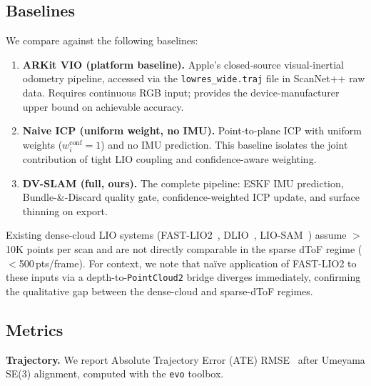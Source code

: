 \subsection{Baselines}
\label{sec:baselines}

We compare against the following baselines:

\begin{enumerate}
    \item \textbf{ARKit VIO (platform baseline).}
    Apple's closed-source visual-inertial odometry pipeline, accessed via the
    \texttt{lowres\_wide.traj} file in ScanNet++ raw data.
    Requires continuous RGB input; provides the device-manufacturer upper
    bound on achievable accuracy.

    \item \textbf{Naive ICP (uniform weight, no IMU).}
    Point-to-plane ICP with uniform weights ($w_i^{\text{conf}} = 1$) and no
    IMU prediction.
    This baseline isolates the joint contribution of tight LIO coupling and
    confidence-aware weighting.

    \item \textbf{DV-SLAM (full, ours).}
    The complete pipeline: ESKF IMU prediction, Bundle-\&-Discard quality
    gate, confidence-weighted ICP update, and surface thinning on export.
\end{enumerate}

Existing dense-cloud LIO systems (FAST-LIO2~\cite{xu2022fastlio2},
DLIO~\cite{chen2023dlio}, LIO-SAM~\cite{shan2020liosam}) assume
$>$10K points per scan and are not directly comparable in the sparse dToF
regime ($<$500\,pts/frame).
For context, we note that na\"{i}ve application of FAST-LIO2 to these inputs
via a depth-to-\texttt{PointCloud2} bridge diverges immediately, confirming
the qualitative gap between the dense-cloud and sparse-dToF regimes.

\subsection{Metrics}
\label{sec:metrics}

\textbf{Trajectory.}
We report Absolute Trajectory Error (ATE) RMSE~\cite{sturm2012benchmark}
after Umeyama SE(3) alignment, computed with the \texttt{evo} toolbox.

